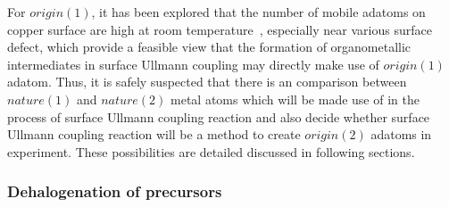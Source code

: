 \documentclass[%
 reprint,
 amsmath,amssymb,
 aps,
prb,
]{revtex4-2}
\begin{document}
For $origin(1)$, it has been explored that the number of mobile adatoms on copper surface are high at room temperature~\cite{ullmann_58}, especially near various surface defect, which provide a feasible view that the formation of organometallic intermediates in surface Ullmann coupling may directly make use of $origin(1)$ adatom. Thus, it is safely suspected that there is an comparison between $nature(1)$ and $nature(2)$ metal atoms which will be made use of in the process of surface Ullmann coupling reaction and also decide whether surface Ullmann coupling reaction will be a method to create $origin(2)$ adatoms in experiment. These possibilities are detailed discussed in following sections.






\subsubsection{Dehalogenation of precursors}
\end{document}
